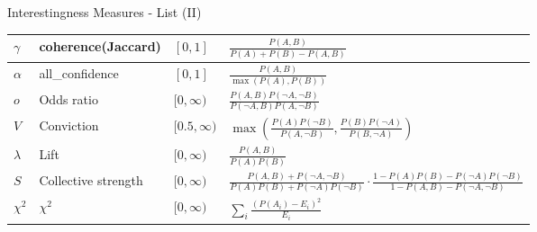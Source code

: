 \begin{frame}{Interestingness Measures - List (II)}
{\begin{tabular}{|m{}<{\centering}|m{}<{\centering}|m{}<{\centering}|m{}<{\centering}|}
			\hline
			$\gamma$        & coherence(Jaccard)  & $[0,1]$        & $\frac{P(A,B)}{P(A)+P(B)-P(A,B)}$                                                                                                           \\
			\hline
			$\alpha$        & all\_confidence     & $[0,1]$        & $\frac{P(A,B)}{\max(P(A),P(B))}$                                                                                                            \\
			\hline
			$o$             & Odds ratio          & $[0,\infty)$   & $\frac{P(A,B)P(\neg A, \neg B)}{P(\neg A,B) P(A,\neg B)}$                                                                                   \\
			\hline
			$V$             & Conviction          & $[0.5,\infty)$ & $\max(\frac{P(A)P(\neg B)}{P(A,\neg B)},\frac{P(B)P(\neg A)}{P(B,\neg A)})$                                                                 \\
			\hline
			$\lambda$       & Lift                & $[0, \infty)$  & $\frac{P(A,B)}{P(A)P(B)}$                                                                                                                   \\
			\hline
			$S$             & Collective strength & $[0,\infty)$   & $\frac{P(A,B) + P(\neg A, \neg B)}{P(A)P(B) + P(\neg A) P(\neg B)} \cdot \frac{1-P(A)P(B)-P(\neg A) P(\neg B)}{1-P(A,B)-P(\neg A, \neg B)}$ \\
			\hline
			$\chi^2$        & $\chi^2$            & $[0,\infty)$   & $\sum_i \frac{(P(A_i)-E_i)^2}{E_i}$                                                                                                         \\
			\hline
		\end{tabular}
	}
\end{frame}

